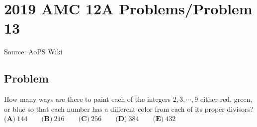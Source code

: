 \documentclass[12pt]{article}
\begin{document}
\section*{{2019 AMC 12A Problems/Problem 13}}
Source: AoPS Wiki

\subsection*{Problem}
How many ways are there to paint each of the integers $2, 3, \cdots , 9$ either red, green, or blue so that each number has a different color from each of its proper divisors? $\textbf{(A)}~144\qquad\textbf{(B)}~216\qquad\textbf{(C)}~256\qquad\textbf{(D)}~384\qquad\textbf{(E)}~432$
\end{document}
